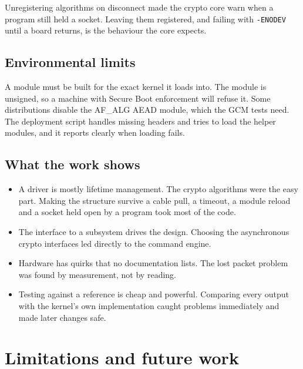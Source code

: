 \documentclass[11pt,a4paper,oneside]{report}
\newcommand{\code}[1]{\texttt{\small #1}}
\begin{document}
Unregistering algorithms on disconnect made the crypto core warn when a program still held a socket. Leaving them registered, and failing with \code{-ENODEV} until a board returns, is the behaviour the core expects.

\section{Environmental limits}

A module must be built for the exact kernel it loads into. The module is unsigned, so a machine with Secure Boot enforcement will refuse it. Some distributions disable the AF\_ALG AEAD module, which the GCM tests need. The deployment script handles missing headers and tries to load the helper modules, and it reports clearly when loading fails.

\section{What the work shows}

\begin{itemize}
  \item A driver is mostly lifetime management. The crypto algorithms were the easy part. Making the structure survive a cable pull, a timeout, a module reload and a socket held open by a program took most of the code.
  \item The interface to a subsystem drives the design. Choosing the asynchronous crypto interfaces led directly to the command engine.
  \item Hardware has quirks that no documentation lists. The lost packet problem was found by measurement, not by reading.
  \item Testing against a reference is cheap and powerful. Comparing every output with the kernel's own implementation caught problems immediately and made later changes safe.
\end{itemize}



\chapter{Limitations and future work}
\end{document}
